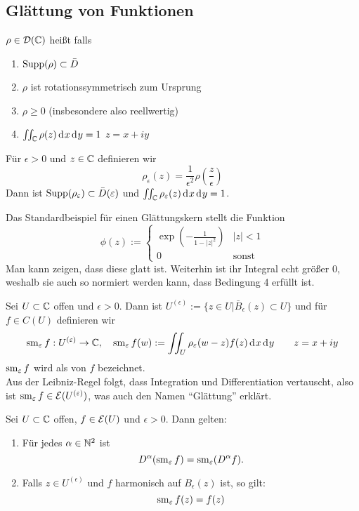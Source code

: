 \subsection{Glättung von Funktionen}
\label{sec:Glättung}

\begin{defin}[Glättungskern]
  $\rho \in \mathcal{D}(\mathbb{C})$ heißt  falls
  \begin{enumerate}
  \item $\operatorname{Supp}(\rho) \subset \bar D$
  \item $\rho$ ist rotationssymmetrisch zum Ursprung
  \item $\rho \geq 0$ (insbesondere also reellwertig)
  \item $\iint_\C \rho(z) \d[x]\d[y] = 1$ $z = x + iy$
  \end{enumerate}
  Für $\epsilon > 0$ und $z \in \mathbb{C}$ definieren wir
  \[
  \rho_\epsilon(z) = \frac{1}{\epsilon^2} \rho\left(
    \frac{z}{\epsilon} \right )
  \]
  Dann ist $\operatorname{Supp}(\rho_\varepsilon) \subset \bar D(\varepsilon)$ und
  $\iint_\C \rho_\epsilon(z) \d[x]\d[y] = 1$.
\end{defin}


\begin{bsp}
  Das Standardbeispiel für einen Glättungskern stellt die Funktion
  \[
  \phi(z) :=
  \begin{cases}
    \exp \left ( - \frac{1}{1 - |z|^2} \right ) & |z| < 1 \\
    0 & \text{sonst}
  \end{cases}
  \]
  Man kann zeigen, dass diese glatt ist. Weiterhin ist ihr Integral
  echt größer 0, weshalb sie auch so normiert werden kann, dass
  Bedingung 4 erfüllt ist.
\end{bsp}

\begin{defin}
  Sei $U \subset \mathbb{C}$ offen und $\epsilon > 0$. Dann ist
  $U^{(\epsilon)} := \{z \in U | \bar B_\epsilon(z) \subset U \}$ und
  für $f \in C(U)$ definieren wir
  \[
  \sm_\epsilon f : U^{(\epsilon)} \ra \C, \quad \sm_\epsilon f(w) :=
  \iint_U \rho_\epsilon(w- z) f(z) \d[x]\d[y] \qquad z = x + iy
  \]
  $\operatorname{sm}_\varepsilon f$ wird als  von $f$ bezeichnet. \\
  Aus der Leibniz-Regel folgt, dass Integration und Differentiation
  vertauscht, also ist $\operatorname{sm}_\varepsilon f \in \mathcal{E}(U^{(\varepsilon)})$, was
  auch den Namen "`Glättung"' erklärt.
\end{defin}

\begin{lemma}
  \label{lemma:glättung-eigenschaften}
  Sei $U \subset \mathbb{C}$ offen, $f \in \mathcal{E}(U)$ und $\epsilon > 0 $. Dann
  gelten:
  \begin{enumerate}
  \item Für jedes $\alpha \in \mathbb{N}^2$ ist
    \[
    D^\alpha( \operatorname{sm}_\varepsilon f) =
    \operatorname{sm}_\varepsilon (D^\alpha f).
    \]
  \item Falls $z \in U^{(\epsilon)}$ und $f$ harmonisch auf
    $B_\epsilon(z)$ ist, so gilt:
    \[
    \operatorname{sm}_\varepsilon f(z) = f(z)
    \]
  \end{enumerate}
\end{lemma}


